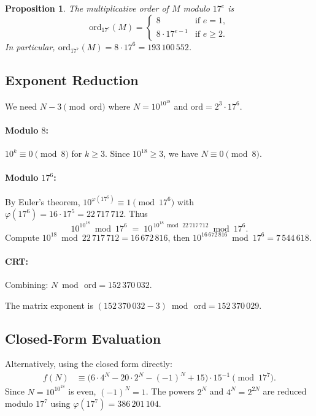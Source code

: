 \documentclass[11pt,a4paper]{article}
\newtheorem{proposition}[theorem]{Proposition}
\begin{document}
\begin{proposition}
The multiplicative order of $M$ modulo $17^e$ is
\[
  \mathrm{ord}_{17^e}(M) =
  \begin{cases}
    8 & \text{if } e=1, \\
    8\cdot 17^{e-1} & \text{if } e\ge 2.
  \end{cases}
\]
In particular, $\mathrm{ord}_{17^7}(M) = 8\cdot 17^6 = 193\,100\,552$.
\end{proposition}

\subsection{Exponent Reduction}

We need $N - 3 \pmod{\mathrm{ord}}$ where $N = 10^{10^{18}}$ and
$\mathrm{ord} = 2^3 \cdot 17^6$.

\paragraph{Modulo $8$:}
$10^k \equiv 0\pmod{8}$ for $k\ge 3$.  Since $10^{18}\ge 3$, we have
$N\equiv 0\pmod{8}$.

\paragraph{Modulo $17^6$:}
By Euler's theorem, $10^{\varphi(17^6)}\equiv 1\pmod{17^6}$ with
$\varphi(17^6)=16\cdot 17^5 = 22\,717\,712$.  Thus
\[
  10^{10^{18}} \bmod 17^6 \;=\; 10^{\,10^{18}\!\bmod\,22\,717\,712}\!\bmod 17^6.
\]
Compute $10^{18}\bmod 22\,717\,712 = 16\,672\,816$, then
$10^{16\,672\,816}\bmod 17^6 = 7\,544\,618$.

\paragraph{CRT:}
Combining: $N\bmod\,\mathrm{ord} = 152\,370\,032$.

The matrix exponent is $(152\,370\,032 - 3)\bmod\,\mathrm{ord} = 152\,370\,029$.

\subsection{Closed-Form Evaluation}

Alternatively, using the closed form directly:
\begin{align*}
  f(N) &\equiv \bigl(6\cdot 4^N - 20\cdot 2^N - (-1)^N + 15\bigr)
         \cdot 15^{-1} \pmod{17^7}.
\end{align*}
Since $N=10^{10^{18}}$ is even, $(-1)^N=1$.  The powers $2^N$ and $4^N=2^{2N}$
are reduced modulo $17^7$ using $\varphi(17^7) = 386\,201\,104$.
\end{document}
